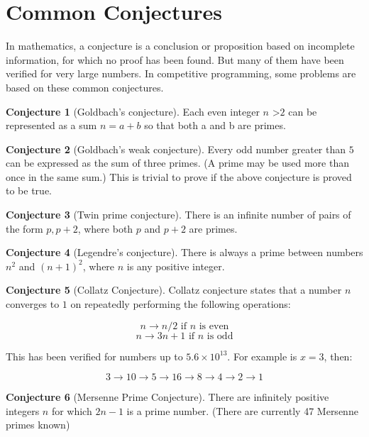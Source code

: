 \documentclass[twoside,12pt,a4paper,english]{book}
\theoremstyle{definition}
\theoremstyle{problemstyle}
\theoremstyle{problemstyle}
\theoremstyle{problemstyle}
\newtheorem{conjecture}{Conjecture}
\begin{document}
\section{Common Conjectures}
In mathematics, a conjecture is a conclusion or proposition based on incomplete information, for which no proof has been found. But many of them have been verified for very large numbers. In competitive programming, some problems are based on these common conjectures.

\begin{conjecture}[Goldbach’s conjecture]
Each even integer $n$ \textgreater $2$ can be represented as a sum $n = a+ b$ so that both a and b are primes.
\end{conjecture}
\begin{conjecture}[Goldbach's weak conjecture]
Every odd number greater than $5$ can be expressed as the sum of three primes. (A prime may be used more than once in the same sum.) This is trivial to prove if the above conjecture is proved to be true.
\end{conjecture}
\begin{conjecture}[Twin prime conjecture]
There is an infinite number of pairs of the form ${p, p +2}$, where both $p$ and $p+2$ are primes.
\end{conjecture}
\begin{conjecture}[Legendre’s conjecture]
 There is always a prime between numbers $n^2$ and $(n+1)^2$, where $n$ is any positive integer.
\end{conjecture}
\begin{conjecture}[Collatz Conjecture]
Collatz conjecture states that a number $n$ converges to $1$ on repeatedly performing the following operations:

$$n \rightarrow n/2 \text{ if }n \text{ is even}$$
$$n \rightarrow 3n+1 \text{ if }n \text{ is odd}$$

This has been verified for numbers up to $5.6 \times 10^{13}$. For example is $x = 3$, then:

$$3 \rightarrow 10 \rightarrow 5 \rightarrow 16 \rightarrow 8 \rightarrow 4 \rightarrow 2 \rightarrow 1$$
\end{conjecture}

\begin{conjecture}[Mersenne Prime Conjecture]
There are infinitely positive integers $n$ for which $2n - 1$ is a prime number. (There are currently 47 Mersenne primes known)
\end{conjecture}
\newpage
\end{document}
